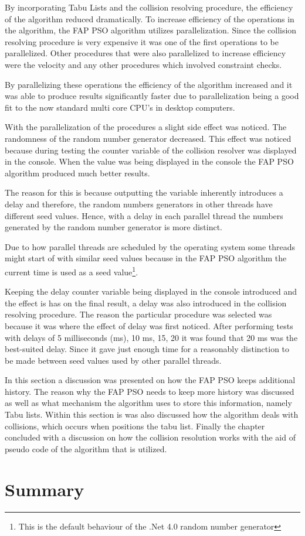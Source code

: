 By incorporating Tabu Lists and the collision resolving procedure, the efficiency of the algorithm reduced dramatically. To increase efficiency of the operations in the algorithm, the FAP PSO algorithm utilizes parallelization. Since the collision resolving procedure is very expensive it was one of the first operations to be parallelized. Other procedures that were also parallelized to increase efficiency were the velocity and any other procedures which involved constraint checks.

By parallelizing these operations the efficiency of the algorithm increased and it was able to produce results significantly faster due to parallelization being a good fit to the now standard multi core CPU's in desktop computers.

With the parallelization of the procedures a slight side effect was noticed. The randomness of the random number generator decreased. This effect was noticed because during testing the counter variable of the collision resolver was displayed in the console. When the value was being displayed in the console the FAP PSO algorithm produced much better results. 

The reason for this is because outputting the variable inherently introduces a delay and therefore, the random numbers generators in other threads have different seed values. Hence, with a delay in each parallel thread the numbers generated by the random number generator is more distinct. 

Due to how parallel threads are scheduled by the operating system some threads might start of with similar seed values because in  the FAP PSO algorithm the current time is used as a seed value\footnote{This is the default behaviour of the .Net 4.0 random number generator}.

Keeping the delay counter variable being displayed in the console introduced and the effect is has on the final result, a delay was also introduced in the collision resolving procedure. The reason the particular procedure was selected was because it was where the effect of delay was first noticed. After performing tests with delays of 5 milliseconds (ms), 10 ms, 15, 20 it was found that 20 ms was the best-suited delay. Since it gave just enough time for a reasonably distinction to be made between seed values used by other parallel threads.

In this section a discussion was presented on how the FAP PSO keeps additional history. The reason why the FAP PSO needs to keep more history was discussed as well as what mechanism the algorithm uses to store this information, namely Tabu lists. Within this section is was also discussed how the algorithm deals with collisions, which occurs when positions the tabu list. Finally the chapter concluded with a discussion on how the collision resolution works with the aid of pseudo code of the algorithm that is utilized.

\section{Summary}
